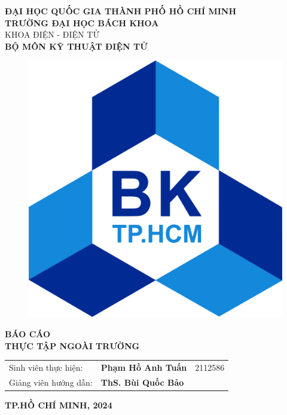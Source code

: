 \begin{center}
    \vspace{-12pt}  \textbf{ĐẠI HỌC QUỐC GIA THÀNH PHỐ HỒ CHÍ MINH \\ TRƯỜNG ĐẠI HỌC BÁCH KHOA} \\ KHOA ĐIỆN - ĐIỆN TỬ\\
    \textbf{\fontsize{14pt}{0pt}\selectfont  BỘ MÔN KỸ THUẬT ĐIỆN TỬ}
    \vspace{0.5cm}
    \begin{figure}[H]
        \centering
        \includegraphics[scale=0.3]{Image/Logo-DH-Bach-Khoa-HCMUT.png}
    \end{figure}
    \fontsize{24pt}{10pt}\selectfont \textbf{BÁO CÁO}\\
    \vspace{1cm}
    \textbf{\fontsize{28pt}{0pt}\selectfont THỰC TẬP NGOÀI TRƯỜNG}\\ 
    \vspace{3cm}
    \begin{table}[H]
        \centering
        \begin{tabular}{l l l}
            \fontsize{14pt}{0pt}\selectfont Sinh viên thực hiện:  & \fontsize{14pt}{0pt}\selectfont
            \textbf{Phạm Hồ Anh Tuấn} & 2112586 \\

            \fontsize{14pt}{0pt}\selectfont Giảng viên hướng dẫn: & \fontsize{14pt}{0pt}\selectfont \textbf{ThS. Bùi Quốc Bảo}
        \end{tabular}
    \end{table}
    \vspace{6cm}
    \fontsize{13pt}{0pt}\selectfont \textbf{TP.HỒ CHÍ MINH, 2024 }
\end{center}